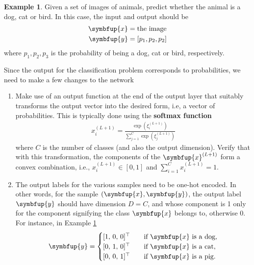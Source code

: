 \documentclass[11pt]{extarticle}
\newcommand{\vx}{\symbfup{x}}
\newcommand{\vy}{\symbfup{y}}
\theoremstyle{definition}
\newtheorem{example}{Example}%
\begin{document}
\begin{example}\label{ex:3class}
Given a set of images of animals, predict whether the animal is a dog, cat or bird. In this case, the input and output should be
\begin{equation*}
  \begin{aligned}
  \vx &= \text{the image}\\
  \vy &= [p_1,p_2,p_2]
  \end{aligned}
\end{equation*}
where $p_1,p_2,p_3$ is the probability of being a dog, cat or bird, respectively.
\end{example}

Since the output for the classification problem corresponds to probabilities, we need to make a few changes to the network
\begin{enumerate}
  \item Make use of an output function at the end of the output layer that suitably transforms the output vector into the desired form, i.e, a vector of probabilities. This is typically done using the \textbf{softmax function}
  \begin{align*}
    x_i^{(L+1)} = \frac{\exp{(\xi_i^{(L+1)})}}{\sum_{j=1}^C\exp{(\xi_j^{(L+1)})}}
  \end{align*}
  where $C$ is the number of classes (and also the output dimension). Verify that with this transformation, the components of the $\vx^{(L+1)}$ form a convex combination, i.e., $x_i^{(L+1)} \in [0,1]$ and $\sum_{i=1}^C x_i^{(L+1)} = 1$.
  \item The output labels for the various samples need to be one-hot encoded. In other words, for the sample $(\vx, \vy)$, the output label $\vy$ should have dimension $D=C$, and whose component is 1 only for the component signifying the class $\vx$ belongs  to, otherwise 0. For instance, in Example \ref{ex:3class} 
  \begin{align*}
    \vy = \begin{cases}
      [1,\,0,\,0]^\top & \quad \text{if $\vx$ is a dog},\\ 
      [0,\,1,\,0]^\top & \quad \text{if $\vx$ is a cat},\\
      [0,\,0,\,1]^\top & \quad \text{if $\vx$ is a pig}.
    \end{cases}
  \end{align*}


\end{enumerate}
\end{document}
